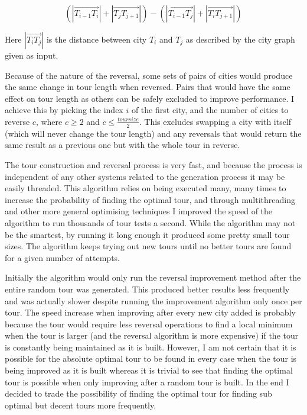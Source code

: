 \documentclass[a4paper,11pt]{article}
\begin{document}
$$(|\overrightarrow{{T_{i-1}}{T_i}}|
+ |\overrightarrow{{T_j}{T_{j+1}}}|)
- (|\overrightarrow{{T_{i-1}}{T_j}}|
+ |\overrightarrow{{T_i}{T_{j+1}}}|)$$

\noindent
Here $|\overrightarrow{{T_i}{T_j}}|$ is the distance between city $T_i$ and
$T_j$ as described by the city graph given as input.

Because of the nature of the reversal, some sets of pairs of cities would 
produce the same change in tour length when reversed. Pairs that would have
the same effect on tour length as others can be safely excluded to improve 
performance. I achieve this by picking the index $i$ of the first city, and the 
number of cities to reverse $c$, where $c \ge 2$ and
$c \le \frac{toursize}{2}$. This excludes swapping a city with itself (which
will never change the tour length) and any reversals that would return the same 
result as a previous one but with the whole tour in reverse.

The tour construction and reversal process is very fast, and because the
process is independent of any other systems related to the generation process
it may be easily threaded. This algorithm relies on being executed many, many
times to increase the probability of finding the optimal tour, and through
multithreading and other more general optimising techniques I improved the
speed of the algorithm to run thousands of tour tests a second. While the
algorithm may not be the smartest, by running it long enough it produced some
pretty small tour sizes. The algorithm keeps trying out new tours until no
better tours are found for a given number of attempts.

Initially the algorithm would only run the reversal improvement method after
the entire random tour was generated. This produced better results less
frequently and was actually slower despite running the improvement algorithm
only once per tour. The speed increase when improving after every new city
added is probably because the tour would require less reversal operations to
find a local minimum when the tour is larger (and the reversal algorithm is more
expensive) if the tour is constantly being maintained as it is built. However,
I am not certain that it is possible for the absolute optimal tour to be found
in every case when the tour is being improved as it is built whereas it is
trivial to see that finding the optimal tour is possible when only improving
after a random tour is built. In the end I decided to trade the possibility of
finding the optimal tour for finding sub optimal but decent tours more
frequently.
\end{document}
